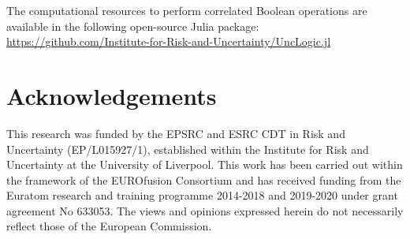 \documentclass[runningheads]{llncs}
\begin{document}
The computational resources to perform correlated Boolean operations are available in the following open-source Julia package: \url{https://github.com/Institute-for-Risk-and-Uncertainty/UncLogic.jl}

\section*{Acknowledgements}

This research was funded by the EPSRC and ESRC CDT in Risk and Uncertainty (EP/L015927/1), established within the Institute for Risk and Uncertainty at the University of Liverpool.
This work has been carried out within the framework of the EUROfusion Consortium and has received funding from the
Euratom research and training programme 2014-2018 and 2019-2020 under grant agreement No 633053.
The views and opinions expressed herein do not necessarily reflect those of the European Commission.

%
%
% 
% 
%

\end{document}
